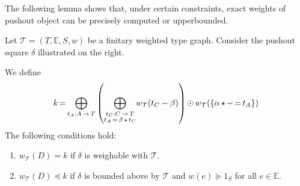 The following lemma shows that, under certain constraints, exact weights of pushout object can be precisely computed or upperbounded.
\begin{lemma}
    \label{lem_4d13}
    Let $\mathcal{T} \mathop{=} (T,\mathbb{E}, S, w)$ be a finitary weighted type graph. Consider the pushout square $\delta$ illustrated on the right. 

    \begin{center} 
  \end{center}
  We define
     \[k \mathop{=} \underset{t_A:A \mathop{\rightarrow} T}{\mathop{\bigoplus}}
            \left ( 
                \underset{\substack{t_C:C \mathop{\rightarrow} T\\
                                            t_A \mathop{=} \beta \mathop{\star} t_C }}{\mathop{\bigoplus}}
                        w_\mathcal{T}(t_C - \beta)     
                 \right ) 
            \mathop{\odot} 
                w_\mathcal{T}(\{\alpha \mathop{\star} - \mathop{=} t_A\})
    \]
    The following conditions hold:
    \begin{enumerate}[label=(\Alph*)]
        \item  $w_\mathcal{T}(D)=k$ if $\delta$ is weighable with $\mathcal{T}$.
        \item  $w_\mathcal{T}(D)\mathop{\preceq} k$ if $\delta$ is bounded above by $\mathcal{T}$  and \(w(e) \mathop{\succeq} 1_S\) for all $e \mathop{\in} \mathbb{E}$.
    \end{enumerate}
\end{lemma}

